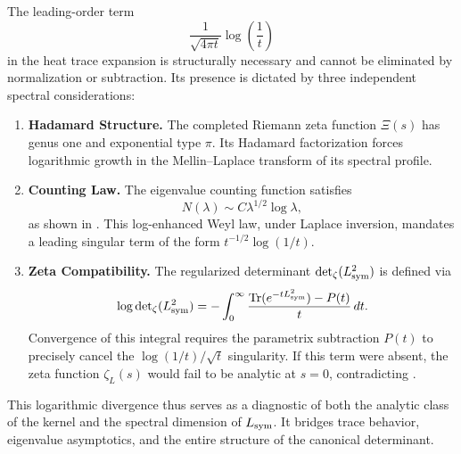 \begin{remark}
\label{rem:log_singularity_necessary}
The leading-order term
\[
\frac{1}{\sqrt{4\pi t}} \log\left( \frac{1}{t} \right)
\]
in the heat trace expansion is structurally necessary and cannot be eliminated by normalization or subtraction. Its presence is dictated by three independent spectral considerations:

\begin{enumerate}
  \item \textbf{Hadamard Structure.} The completed Riemann zeta function \( \Xi(s) \) has genus one and exponential type \( \pi \). Its Hadamard factorization forces logarithmic growth in the Mellin–Laplace transform of its spectral profile.

  \item \textbf{Counting Law.} The eigenvalue counting function satisfies
  \[
  N(\lambda) \sim C \lambda^{1/2} \log \lambda,
  \]
  as shown in . This log-enhanced Weyl law, under Laplace inversion, mandates a leading singular term of the form \( t^{-1/2} \log(1/t) \).

  \item \textbf{Zeta Compatibility.} The regularized determinant \( \det\nolimits_\zeta(L_{\mathrm{sym}}^2) \) is defined via
  \[
  \log \det\nolimits_\zeta(L_{\mathrm{sym}}^2) = -\int_0^\infty \frac{\operatorname{Tr}(e^{-t L_{\mathrm{sym}}^2}) - P(t)}{t} \, dt.
  \]
  Convergence of this integral requires the parametrix subtraction \( P(t) \) to precisely cancel the \( \log(1/t)/\sqrt{t} \) singularity. If this term were absent, the zeta function \( \zeta_L(s) \) would fail to be analytic at \( s = 0 \), contradicting .
\end{enumerate}

\medskip
\noindent
This logarithmic divergence thus serves as a diagnostic of both the analytic class of the kernel and the spectral dimension of \( L_{\mathrm{sym}} \). It bridges trace behavior, eigenvalue asymptotics, and the entire structure of the canonical determinant.
\end{remark}
